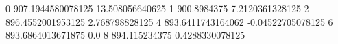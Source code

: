 0 907.1944580078125 13.508056640625
1 900.8984375 7.2120361328125
2 896.4552001953125 2.768798828125
4 893.6411743164062 -0.04522705078125
6 893.6864013671875 0.0
8 894.115234375 0.4288330078125

